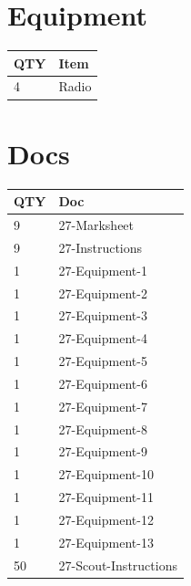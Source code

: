\documentclass[10pt]{article}
\begin{document}
	\begin{multicols}{2}

		\section*{\faWrench \: Equipment}

		
	\begin{center}
			\begin{tabular}{p{2cm}p{4cm}}


				\textbf{QTY} & \textbf{Item} \\\toprule
												4&Radio\\\midrule
								\end{tabular}

			\end{center}

		
		\vfill\null
		\columnbreak

			\section*{\faFile \: Docs}
		 	\begin{center}
			\begin{tabular}{p{2cm}p{4cm}}

			\textbf{QTY} & \textbf{Doc} \\\toprule
										9&27-Marksheet\\\midrule
										9&27-Instructions\\\midrule
										1&27-Equipment-1\\\midrule
										1&27-Equipment-2\\\midrule
										1&27-Equipment-3\\\midrule
										1&27-Equipment-4\\\midrule
										1&27-Equipment-5\\\midrule
										1&27-Equipment-6\\\midrule
										1&27-Equipment-7\\\midrule
										1&27-Equipment-8\\\midrule
										1&27-Equipment-9\\\midrule
										1&27-Equipment-10\\\midrule
										1&27-Equipment-11\\\midrule
										1&27-Equipment-12\\\midrule
										1&27-Equipment-13\\\midrule
										50&27-Scout-Instructions\\\midrule
							\end{tabular}
			\end{center}
	

		\vfill\null

		\end{multicols}
\end{document}
